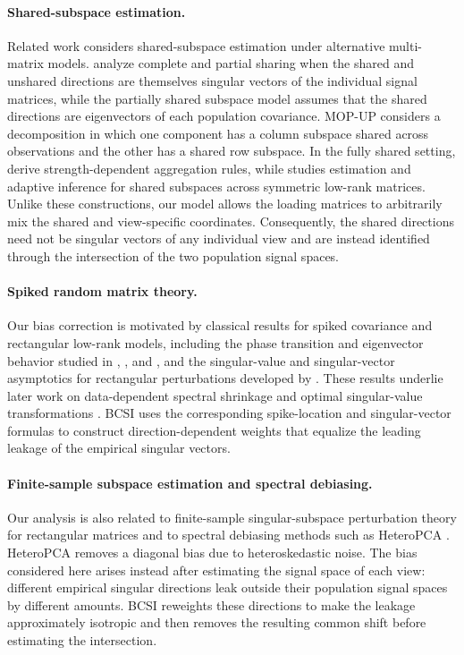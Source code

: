 \documentclass[11pt]{article}
\begin{document}
\paragraph{Shared-subspace estimation.}
Related work considers shared-subspace estimation under alternative
multi-matrix models.  \citet{ma2026optimal} analyze
complete and partial sharing when the shared and unshared directions are
themselves singular vectors of the individual signal matrices, while the
partially shared subspace model \citep{yoon2026joint} assumes that the shared
directions are eigenvectors of each population covariance.  MOP-UP
\citep{tang2025modewise} considers a decomposition in which one component
has a column subspace shared across observations and the other has a shared
row subspace.  In the fully shared setting,  \citet{baharav2025stacked} derive strength-dependent aggregation rules, while \citet{agterberg2026statistically} studies estimation and adaptive inference for shared subspaces across symmetric low-rank matrices.  
Unlike these constructions, our model allows the loading matrices to arbitrarily mix the shared and
view-specific coordinates. Consequently, the shared directions need not be singular
vectors of any individual view and are instead identified through the
intersection of the two population signal spaces.

\paragraph{Spiked random matrix theory.}
Our bias correction is motivated by classical results for spiked covariance
and rectangular low-rank models, including the phase transition and
eigenvector behavior studied in
\citet{johnstone2001distribution}, \cite{baik2005phase}, and \cite{paul2007asymptotics},
and the singular-value and singular-vector asymptotics for rectangular
perturbations developed by \citet{benaych2012singular}.
These results underlie later work on data-dependent spectral shrinkage and
optimal singular-value transformations
\citep{nadakuditi2014optshrink,gavish2017optimal}.
BCSI uses the corresponding spike-location and singular-vector formulas to
construct direction-dependent weights that equalize the leading leakage of
the empirical singular vectors.

\paragraph{Finite-sample subspace estimation and spectral debiasing.}
Our analysis is also related to finite-sample singular-subspace perturbation
theory for rectangular matrices
\citep{cai2018rate,Cai2021Unbalanced} and to spectral debiasing methods such as
HeteroPCA \citep{zhang2022heteropca}.
HeteroPCA removes a diagonal bias due to heteroskedastic noise.  The bias considered here arises instead
after estimating the signal space of each view: different empirical singular
directions leak outside their population signal spaces by different amounts.
BCSI reweights these directions to make the leakage approximately isotropic
and then removes the resulting common shift before estimating the
intersection.
\end{document}
